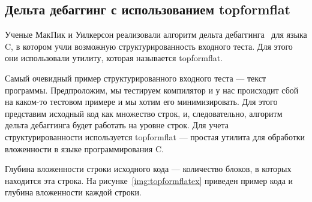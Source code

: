 \subsection{Дельта дебаггинг с использованием topformflat}
Ученые МакПик и Уилкерсон реализовали алгоритм дельта дебаггинга~\cite{delta} для языка C, в котором учли возможную структурированность входного теста. Для этого они использовали утилиту, которая называется topformflat.

Самый очевидный пример структурированного входного теста --- текст программы. Предпроложим, мы тестируем компилятор и у нас происходит сбой на каком-то тестовом примере и мы хотим его минимизировать. Для этого представим исходный код как множество строк, и, следовательно, алгоритм дельта дебаггинга будет работать на уровне строк. Для учета структурированности используется topformflat --- простая утилита для обработки вложенности в языке программирования C. 

Глубина вложенности строки исходного кода --- количество блоков, в которых находится эта строка. На рисунке~\ref{img:topformflatex} приведен пример кода и глубина вложенности каждой строки.

